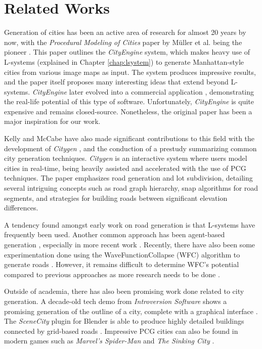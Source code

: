 \section{Related Works}

Generation of cities has been an active area of research for almost 20 years by now, with the \textit{Procedural Modeling of Cities} paper by Müller et al. being the pioneer \cite{muller_city_gen}.
This paper outlines the \textit{CityEngine} system, which makes heavy use of L-systems (explained in Chapter \ref{chap:lsystem}) to generate Manhattan-style cities from various image maps as input.
The system produces impressive results, and the paper itself proposes many interesting ideas that extend beyond L-systems.
\textit{CityEngine} later evolved into a commercial application \cite{esri}, demonstrating the real-life potential of this type of software.
Unfortunately, \textit{CityEngine} is quite expensive and remains closed-source.
Nonetheless, the original paper has been a major inspiration for our work.

Kelly and McCabe have also made significant contributions to this field with the development of \textit{Citygen} \cite{citygen_paper}, and the conduction of a prestudy \cite{citygen_paper_prestudy} summarizing common city generation techniques. 
\textit{Citygen} is an interactive system where users model cities in real-time, being heavily assisted and accelerated with the use of PCG techniques.
The paper emphasizes road generation and lot subdivision, detailing several intriguing concepts such as road graph hierarchy, snap algorithms for road segments, and strategies for building roads between significant elevation differences.

A tendency found amongst early work on road generation is that L-systems have frequently been used.
Another common approach has been agent-based generation \cite{agent_based_roads}, especially in more recent work \cite{tmwhere} \cite{robin}.
Recently, there have also been some experimentation done using the WaveFunctionCollapse (WFC) algorithm \cite{wavefunc} to generate roads \cite{wavefunc_roads}.
However, it remains difficult to determine WFC's potential compared to previous approaches as more research needs to be done \cite[p.50]{wavefunc_roads}.

Outside of academia, there has also been promising work done related to city generation.
A decade-old tech demo from \textit{Introversion Software} shows a promising generation of the outline of a city, complete with a graphical interface \cite{subversion}.
The \textit{SceneCity} plugin for Blender \cite{blender} is able to produce highly detailed buildings connected by grid-based roads \cite{scenecity}.
Impressive PCG cities can also be found in modern games such as \textit{Marvel's Spider-Man} \cite{pcg_spiderman} and \textit{The Sinking City} \cite{pcg_sunken_city}.

